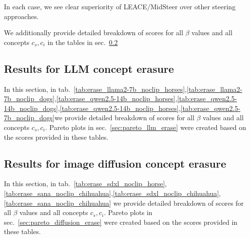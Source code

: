 In each case, we see clear superiority of LEACE/MidSteer over other steering approaches.

We additionally provide detailed breakdown of scores for all $\beta$ values and all concepts $c_s, c_i$ in the tables in sec.~\ref{sec:tables_diffusion_erase}



\clearpage
\subsection{Results for LLM concept erasure}
\label{sec:tables_llm_erase}

In this section, in tab.~\ref{tab:erase_llama2-7b_noclip_horses},\ref{tab:erase_llama2-7b_noclip_dogs},\ref{tab:erase_qwen2.5-14b_noclip_horses},\ref{tab:erase_qwen2.5-14b_noclip_dogs},\ref{tab:erase_qwen2.5-14b_noclip_horses},\ref{tab:erase_qwen2.5-7b_noclip_dogs}we provide detailed breakdown of scores for all $\beta$ values and all concepts $c_s, c_i$. Pareto plots in sec.~\ref{sec:pareto_llm_erase} were created based on the scores provided in these tables.



\clearpage
\subsection{Results for image diffusion concept erasure}
\label{sec:tables_diffusion_erase}

In this section, in tab.~\ref{tab:erase_sdxl_noclip_horse},\ref{tab:erase_sana_noclip_chihuahua},\ref{tab:erase_sdxl_noclip_chihuahua},\ref{tab:erase_sana_noclip_chihuahua} we provide detailed breakdown of scores for all $\beta$ values and all concepts $c_s, c_i$. Pareto plots in sec.~\ref{sec:pareto_diffusion_erase} were created based on the scores provided in these tables.


